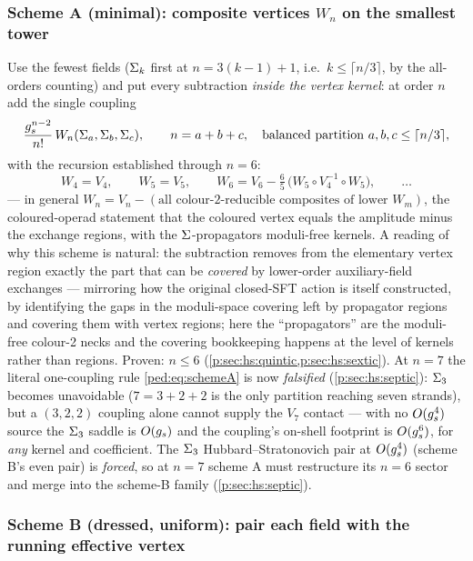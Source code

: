 \subsubsection{Scheme A (minimal): composite vertices \texorpdfstring{$W_n$}{Wn} on the
smallest tower}
\label{ped:sec:allorders:min}

Use the fewest fields ($\Sigma_k$ first at $n=3(k{-}1)+1$, i.e.\ $k\le\lceil n/3\rceil$,
by the all-orders counting) and put every subtraction \emph{inside the vertex kernel}: at order $n$
add the single coupling
\begin{equation}
	\frac{g_s^{n-2}}{n!}\,W_n(\Sigma_a,\Sigma_b,\Sigma_c),
	\qquad n=a+b+c,\quad\text{balanced partition } a,b,c\le\lceil n/3\rceil,
	\label{ped:eq:schemeA}
\end{equation}
with the recursion established through $n=6$:
\begin{equation}
	W_4=V_4,\qquad W_5=V_5,\qquad
	W_6=V_6-\tfrac65\,\big(W_5\circ V_4^{-1}\circ W_5\big),\qquad\dots
	\label{ped:eq:Wnrecursion}
\end{equation}
--- in general $W_n=V_n-(\text{all colour-2-reducible composites of lower }W_m)$, the
coloured-operad statement that the coloured vertex equals the amplitude minus the exchange
regions, with the $\Sigma$-propagators moduli-free kernels. A reading
of why this scheme is natural: the subtraction removes from the
elementary vertex region exactly the part that can be \emph{covered} by lower-order
auxiliary-field exchanges --- mirroring how the original closed-SFT action is itself
constructed, by identifying the gaps in the moduli-space covering left by propagator
regions and covering them with vertex regions; here the \enquote{propagators} are the
moduli-free colour-2 necks and the covering bookkeeping happens at the level of kernels
rather than regions. Proven:
$n\le6$ (\cref{p:sec:hs:quintic,p:sec:hs:sextic}). At $n=7$ the literal one-coupling rule
\eqref{ped:eq:schemeA} is now \emph{falsified} (\cref{p:sec:hs:septic}):
$\Sigma_3$ becomes unavoidable ($7=3+2+2$ is the only partition reaching seven strands),
but a $(3,2,2)$ coupling alone cannot supply the $V_7$ contact --- with no $O(g_s^4)$
source the $\Sigma_3$ saddle is $O(g_s)$ and the coupling's on-shell footprint is
$O(g_s^6)$, for \emph{any} kernel and coefficient. The $\Sigma_3$
Hubbard--Stratonovich pair at $O(g_s^4)$ (scheme B's even pair) is \emph{forced}, so at
$n=7$ scheme A must restructure its $n=6$ sector and merge into the scheme-B family
(\cref{p:sec:hs:septic}).

\subsubsection{Scheme B (dressed, uniform): pair each field with the running effective
vertex}
\label{ped:sec:allorders:dressed}

